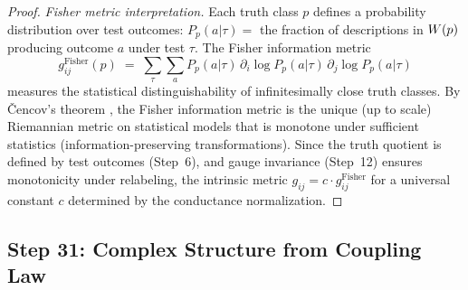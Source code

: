 \begin{proof}
\emph{Fisher metric interpretation.}  Each truth class $p$ defines a
probability distribution over test outcomes: $P_p(a | \tau) = $ the
fraction of descriptions in $W(p)$ producing outcome $a$ under
test $\tau$.  The Fisher information metric
\[
  g^{\mathrm{Fisher}}_{ij}(p) \;=\;
  \sum_\tau \sum_a P_p(a|\tau) \,
  \partial_i \log P_p(a|\tau) \, \partial_j \log P_p(a|\tau)
\]
measures the statistical distinguishability of infinitesimally close
truth classes.  By \v{C}encov's theorem \citep{cencov1982}, the Fisher
information metric is the unique (up to scale) Riemannian metric on
statistical models that is monotone under sufficient statistics
(information-preserving transformations).  Since the truth quotient is
defined by test outcomes (Step~6), and gauge invariance (Step~12)
ensures monotonicity under relabeling, the intrinsic metric
$g_{ij} = c \cdot g^{\mathrm{Fisher}}_{ij}$ for a universal constant $c$
determined by the conductance normalization.

\end{proof}


\subsection{Step 31: Complex Structure from Coupling Law}\label{app:step31}

